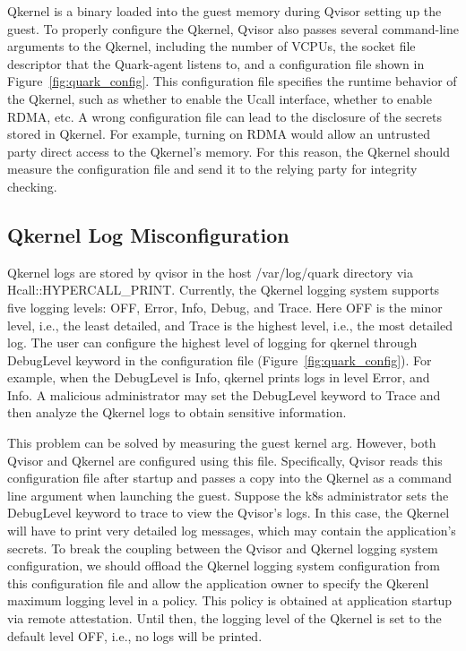 Qkernel is a binary loaded into the guest memory during Qvisor setting up the guest. To properly configure the Qkernel, Qvisor also passes several command-line arguments to the Qkernel, including the number of VCPUs, the socket file descriptor that 
the Quark-agent listens to, and a configuration file shown in Figure~\ref{fig:quark_config}. This configuration file specifies the runtime behavior of the Qkernel, such as whether to enable the Ucall interface, whether to enable RDMA, etc. A wrong configuration file 
can lead to the disclosure of the secrets stored in Qkernel. For example, turning on RDMA would allow an untrusted party direct access to the Qkernel’s memory. For this reason, the Qkernel should measure the configuration file and send it to the relying party for integrity checking.

\subsection{Qkernel Log Misconfiguration}
\label{sec:Qkernel_Log_Misconfiguration}

Qkernel logs are stored by qvisor in the host /var/log/quark directory via Hcall::HYPERCALL\_PRINT. Currently, the Qkernel logging system supports five logging levels: OFF, Error, Info, Debug, and Trace. Here OFF is the minor level, i.e., 
the least detailed, and Trace is the highest level, i.e., the most detailed log. The user can configure the highest level of logging for qkernel through DebugLevel keyword in the configuration file (Figure~\ref{fig:quark_config}). For example, when 
the DebugLevel is Info, qkernel prints logs in level Error, and Info. A malicious administrator may set the DebugLevel keyword to Trace and then analyze the Qkernel logs to obtain sensitive information. 

This problem can be solved by measuring the guest kernel arg. However, both Qvisor and Qkernel are configured using this file. Specifically, Qvisor reads this configuration file after startup and passes a copy into the Qkernel as a command line 
argument when launching the guest. Suppose the k8s administrator sets the DebugLevel keyword to trace to view the Qvisor’s logs. In this case, the Qkernel will have to print very detailed log messages, which may contain the application’s secrets. 
To break the coupling between the Qvisor and Qkernel logging system configuration, we should offload the Qkernel logging system configuration from this configuration file and allow the application owner to specify the Qkerenl maximum logging level 
in a policy. This policy is obtained at application startup via remote attestation. Until then, the logging level of the Qkernel is set to the default level OFF, i.e., no logs will be printed.




